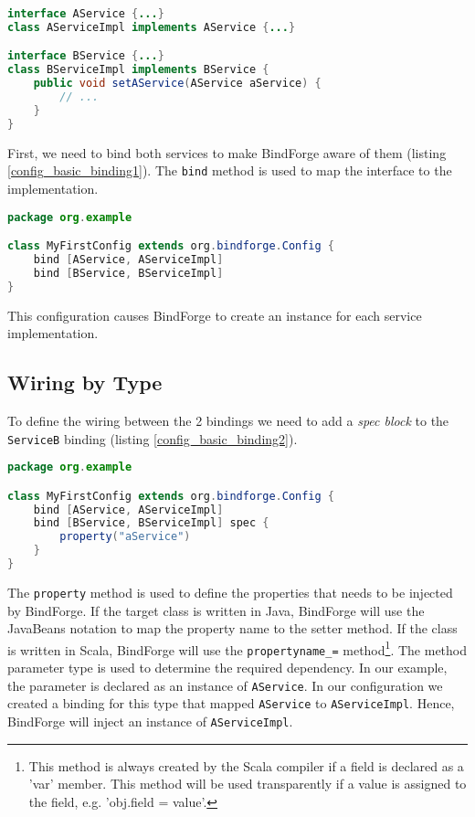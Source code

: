 \begin{lstlisting}[caption={Example classes},label=config_basic_binding_classes,language=Java]
interface AService {...}
class AServiceImpl implements AService {...}

interface BService {...}
class BServiceImpl implements BService {
    public void setAService(AService aService) {
        // ...
    }
}
\end{lstlisting}

First, we need to bind both services to make BindForge aware of them (listing \ref{config_basic_binding1}). The \verb!bind! method is used to map the interface to the implementation. 

\begin{lstlisting}[caption={Simple bindings},label=config_basic_binding1,language=Java]
package org.example

class MyFirstConfig extends org.bindforge.Config {
    bind [AService, AServiceImpl]
    bind [BService, BServiceImpl]
}
\end{lstlisting}

This configuration causes BindForge to create an instance for each service implementation. 

\subsection{Wiring by Type}

To define the wiring between the 2 bindings we need to add a \textit{spec block} to the \verb!ServiceB! binding (listing \ref{config_basic_binding2}).

\begin{lstlisting}[caption={Specify properties},label=config_basic_binding2,language=Java]
package org.example

class MyFirstConfig extends org.bindforge.Config {
    bind [AService, AServiceImpl]
    bind [BService, BServiceImpl] spec {
        property("aService")
    }
}
\end{lstlisting}

The \verb!property! method is used to define the properties that needs to be injected by BindForge. If the target class is written in Java, BindForge will use the JavaBeans notation to map the property name to the setter method. If the class is written in Scala, BindForge will use the \verb!propertyname_=! method\footnote{This method is always created by the Scala compiler if a field is declared as a 'var' member. This method will be used transparently if a value is assigned to the field, e.g. 'obj.field = value'.}. The method parameter type is used to determine the required dependency. In our example, the parameter is declared as an instance of \verb!AService!. In our configuration we created a binding for this type that mapped \verb!AService! to \verb'AServiceImpl'. Hence, BindForge will inject an instance of \verb!AServiceImpl!.

